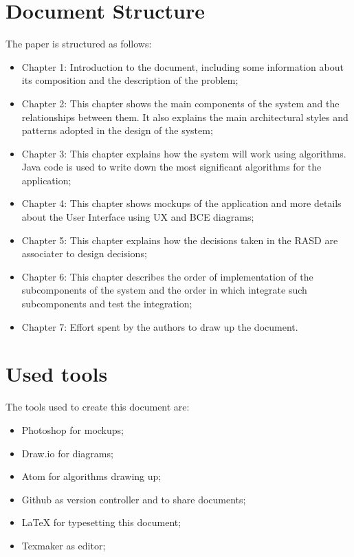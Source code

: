 \section{Document Structure}
The paper is structured as follows:
\begin{itemize}
\item	Chapter 1: Introduction to the document, including some information
about its composition and the description of the problem;
\item	Chapter 2: This chapter shows the main components of the system and the relationships between them. It also explains the main architectural styles and patterns adopted in the design of the system;
\item	Chapter 3: This chapter explains how the system will work using algorithms. Java code is used to write down the most significant algorithms for the application;
\item	Chapter 4: This chapter shows mockups of the application and more details about the User Interface using UX and BCE diagrams;
\item	Chapter 5: This chapter explains how the decisions taken in the RASD are associater to design decisions;
\item	Chapter 6: This chapter describes the order of implementation of the subcomponents of the system and the order in which integrate
such subcomponents and test the integration;
\item	Chapter 7: Effort spent by the authors to draw up the document.
\end{itemize}
%
%
\section{Used tools}
The tools used to create this document are:
\begin{itemize}
\item	Photoshop for mockups;
\item	Draw.io for diagrams;	
\item	Atom for algorithms drawing up;
\item	Github as version controller and to share documents;
\item	LaTeX for typesetting this document;
\item	Texmaker as editor;
\end{itemize}
%
